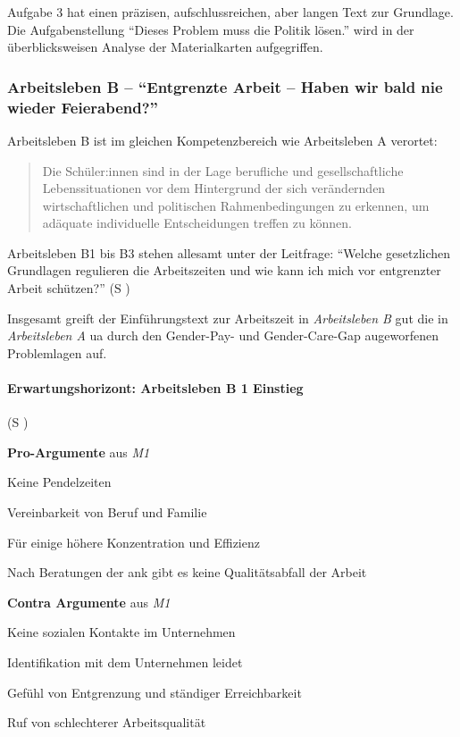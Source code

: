 Aufgabe 3 hat einen präzisen, aufschlussreichen, aber langen Text zur Grundlage. Die Aufgabenstellung \enquote{Dieses Problem muss die Politik lösen.} wird in der überblicksweisen Analyse der Materialkarten aufgegriffen. 



\subsubsection{Arbeitsleben B -- \enquote{Entgrenzte Arbeit – Haben wir bald nie wieder Feierabend?}}
Arbeitsleben B ist im gleichen Kompetenzbereich wie Arbeitsleben A verortet: 
\begin{quotation}
    Die Schüler:innen sind in der Lage berufliche und gesellschaftliche Lebenssituationen vor dem Hintergrund der sich verändernden wirtschaftlichen und politischen Rahmenbedingungen zu erkennen, um adäquate individuelle Entscheidungen treffen zu können.

    \autocite[18]{bplan}
\end{quotation}

Arbeitsleben B1 bis B3 stehen allesamt unter der Leitfrage:
\enquote{Welche gesetzlichen Grundlagen regulieren die Arbeitszeiten und wie kann ich mich vor entgrenzter Arbeit schützen?} (\gls{S} \pageref{ARBEITSLEBEN-B1})

Insgesamt greift der Einführungstext zur Arbeitszeit in \emph{Arbeitsleben B} gut die in \emph{Arbeitsleben A} \gls{ua} durch den Gender-Pay- und Gender-Care-Gap augeworfenen Problemlagen auf. 


\paragraph{Erwartungshorizont: Arbeitsleben B 1 Einstieg} (\gls{S} \pageref{ARBEITSLEBEN-B1})
\begin{myitemize}
    \item[] \textbf{Pro-Argumente} aus \emph{M1}
    \item Keine Pendelzeiten
    \item Vereinbarkeit von Beruf und Familie
    \item Für einige höhere Konzentration und Effizienz
    \item Nach Beratungen der \gls{ank} gibt es keine Qualitätsabfall der Arbeit
    \item[]    
    \item[] \textbf{Contra Argumente} aus \emph{M1}
    \item Keine sozialen Kontakte im Unternehmen
    \item Identifikation mit dem Unternehmen leidet 
    \item Gefühl von Entgrenzung und ständiger Erreichbarkeit 
    \item Ruf von schlechterer Arbeitsqualität
\end{myitemize}

